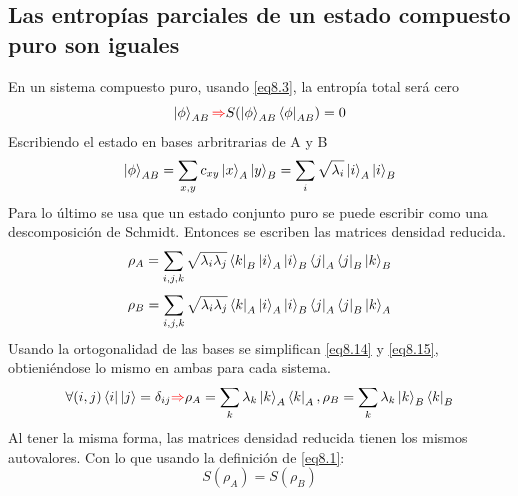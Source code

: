 \documentclass{book}
\begin{document}
    \subsection{{Las entropías parciales de un estado compuesto puro son iguales}} En un sistema compuesto puro, usando \ref{eq8.3}, la entropía total será cero 
    \begin{equation}{\label{eq8.12} \ket{\phi}_{AB} \textcolor{red}{\Rightarrow} S(\ket{\phi}_{AB}\bra{\phi}_{AB})=0}\end{equation}
    Escribiendo el estado en bases arbritrarias de A y B
    \begin{equation}\label{eq8.13} {\ket{\phi}_{AB}=\sum_{x,y} c_{xy}\ket{x}_A\ket{y}_B=\sum_{i}\sqrt{\lambda_i}\ket{i}_A\ket{i}_B}\end{equation}
    Para lo último se usa que un estado conjunto puro se puede escribir como una descomposición de Schmidt. Entonces se escriben las matrices densidad reducida.
    \begin{equation}\label{eq8.14}{ \rho_{A}=\sum_{i,j,k} \sqrt{\lambda_i\lambda_j}\bra{k}_B\ket{i}_A\ket{i}_B\bra{j}_A\bra{j}_B \ket{k}_B}\end{equation}
    \begin{equation}\label{eq8.15}{ \rho_{B}=\sum_{i,j,k} \sqrt{\lambda_i\lambda_j}\bra{k}_A\ket{i}_A\ket{i}_B\bra{j}_A\bra{j}_B \ket{k}_A}\end{equation}
    Usando la ortogonalidad de las bases se simplifican \ref{eq8.14} y \ref{eq8.15}, obtieniéndose lo mismo en ambas para cada sistema.
    \begin{equation} \label{eq8.16}{ \forall (i,j)\bra{i}\ket{j}=\delta_{ij}\textcolor{red}{\Rightarrow} \rho_A=\sum_k\lambda_k\ket{k}_A\bra{k}_A, \rho_B=\sum_k\lambda_k\ket{k}_B\bra{k}_B}\end{equation}
    Al tener la misma forma, las matrices densidad reducida tienen los mismos autovalores. Con lo que usando la definición de \ref{eq8.1}:
    \begin{equation} \label{eq8.17}{ S(\rho_A)=S(\rho_B)}\end{equation}
\end{document}
